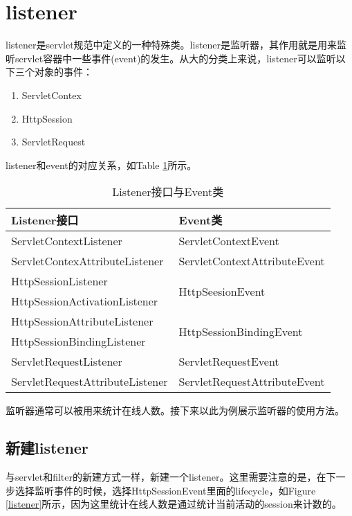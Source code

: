 \section{listener}
listener是servlet规范中定义的一种特殊类。listener是监听器，其作用就是用来监听servlet容器中一些事件(event)的发生。从大的分类上来说，listener可以监听以下三个对象的事件：\begin{enumerate}
\item
ServletContex
\item
HttpSession
\item
ServletRequest
\end{enumerate}
listener和event的对应关系，如Table \ref{le}所示。
\begin{table}
\begin{tabular}{ll}
\toprule
\textbf{Listener接口}&\textbf{Event类}\\
\midrule
ServletContextListener&ServletContextEvent\\
ServletContexAttributeListener&ServletContextAttributeEvent\\
HttpSessionListener&\multirow{2}{*}{HttpSeesionEvent}\\
HttpSessionActivationListener&\\
HttpSessionAttributeListener&\multirow{2}{*}{HttpSessionBindingEvent}\\
HttpSessionBindingListener&\\
ServletRequestListener&ServletRequestEvent\\
ServletRequestAttributeListener&ServletRequestAttributeEvent\\
\bottomrule
\end{tabular}
\caption{Listener接口与Event类}
\label{le}
\end{table}

监听器通常可以被用来统计在线人数。接下来以此为例展示监听器的使用方法。
\subsection{新建listener}
与servlet和filter的新建方式一样，新建一个listener。这里需要注意的是，在下一步选择监听事件的时候，选择HttpSessionEvent里面的lifecycle，如Figure \ref{listener}所示，因为这里统计在线人数是通过统计当前活动的session来计数的。
%

